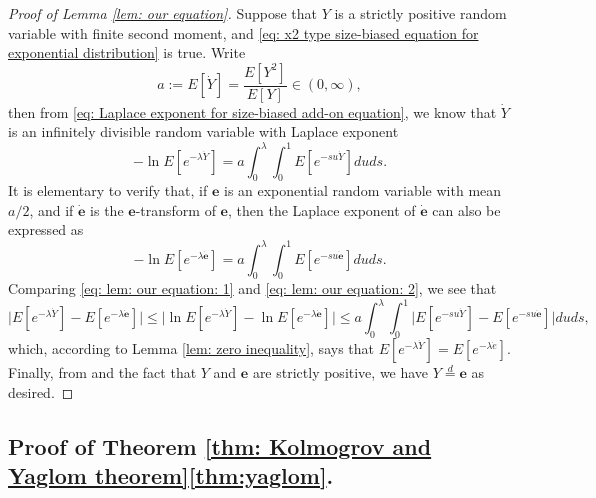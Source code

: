 \documentclass[12pt,a4paper]{amsart}
\numberwithin{equation}{section}
\begin{document}
\begin{proof}[Proof of Lemma \ref{lem: our equation}]
	Suppose that $Y$ is a strictly positive random variable with finite second moment, and \eqref{eq: x2 type size-biased equation for exponential distribution} is true.
	Write 
\[
	a 
	:= E[\dot Y] 
	= \frac{ E[Y^2] }{ E[Y] } \in (0,\infty),
\]	
	then from \eqref{eq: Laplace exponent for size-biased add-on equation}, we know that $\dot Y$ is an infinitely divisible random variable with Laplace exponent
\begin{equation}\label{eq: lem: our equation: 1}
	-\ln E[ e^{-\lambda \dot Y}] 
	=  a  \int_0^\lambda \int_0^1 E [e^{-s u \dot Y}] du ds.
\end{equation}
	It is elementary to verify that, if $\mathbf e$ is an exponential random variable with mean 
$a/2$,
	 and if $\dot {\mathbf e}$ is the $\mathbf e$-transform of $\mathbf e$, then the Laplace exponent of $\dot {\mathbf e}$ can also be expressed as
\begin{equation}\label{eq: lem: our equation: 2}
	-\ln E[ e^{-\lambda \dot {\mathbf e}}] 
	=  a  \int_0^\lambda \int_0^1 E [e^{-s u \dot {\mathbf e}}] du ds.
\end{equation}
	Comparing \eqref{eq: lem: our equation: 1} and \eqref{eq: lem: our equation: 2}, we see that
\[
	\big|E[ e^{-\lambda \dot Y}] - E[ e^{-\lambda \dot {\mathbf e}}] \big| 
	\leq  \big|\ln E[ e^{-\lambda \dot Y}] - \ln E[ e^{-\lambda \dot {\mathbf e}}] \big| 
	\leq  a  \int_0^\lambda \int_0^1 \big| E [e^{-s u \dot Y}] - E [e^{-s u \dot {\mathbf e}}] \big| du ds,
\]
	which, according to Lemma \ref{lem: zero inequality}, says that $E[e^{-\lambda \dot Y}] = E[e^{- \lambda \dot e}]$.
	Finally, from \cite[Lemma 2.6]{ArratiaGoldsteinKochman2013} and the fact that $Y$ and $\mathbf e$ are strictly positive, we have
	$Y \overset{d} = \mathbf e$ as desired.
\end{proof}

\subsection{Proof of Theorem \ref{thm: Kolmogrov and Yaglom theorem}\eqref{thm:yaglom}.}
\label{sec: proof of yaglom's theorem}
\end{document}
